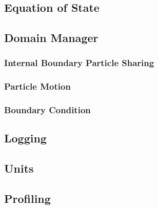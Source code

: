 \subsection{Equation of State}

\subsection{Domain Manager}
\subsubsection{Internal Boundary Particle Sharing}
\subsubsection{Particle Motion}
\subsubsection{Boundary Condition}

\subsection{Logging}

\subsection{Units}

\subsection{Profiling}
